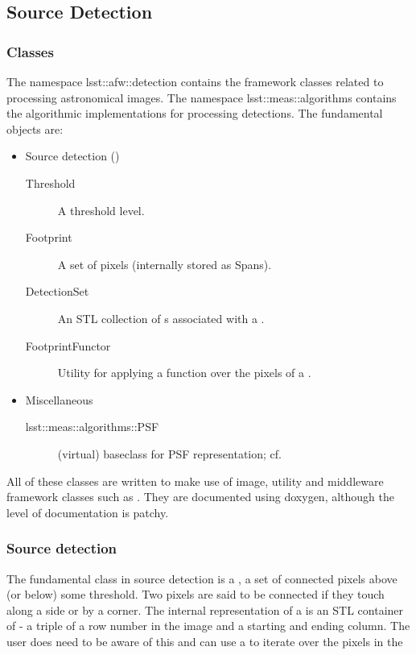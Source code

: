 
\subsection{Source Detection}
\label{secDetection}

\subsubsection{Classes}

The namespace lsst::afw::detection contains the framework classes related to 
processing astronomical images. The namespace lsst::meas::algorithms contains
the algorithmic implementations for processing detections.
The fundamental objects are:\begin{itemize}
\item Source detection ()
\begin{description}
    \item[Threshold] A threshold level.
    \item[Footprint] A set of pixels (internally stored as Spans).
    \item[DetectionSet] An STL collection of s associated 
        with a .
    \item[FootprintFunctor] Utility for applying a function over the pixels of
        a .
\end{description}
\item Miscellaneous
\begin{description}
    \item[lsst::meas::algorithms::PSF] (virtual) baseclass for PSF representation; cf. 
    \end{description}
\end{itemize}

All of these classes are written to make use of image, utility and middleware
framework classes such as . They are 
documented using doxygen, although the level of documentation is patchy.

\subsubsection{Source detection}

The fundamental class in source detection is a , a set of 
connected pixels above (or below) some threshold. Two pixels are said to be 
connected if they touch along a side or by a corner. The internal 
representation of a  is an STL container of  - 
a triple of a row number in the image and a starting and ending column. The 
user does need to be aware of this and can use a  to
iterate over the pixels in the 

